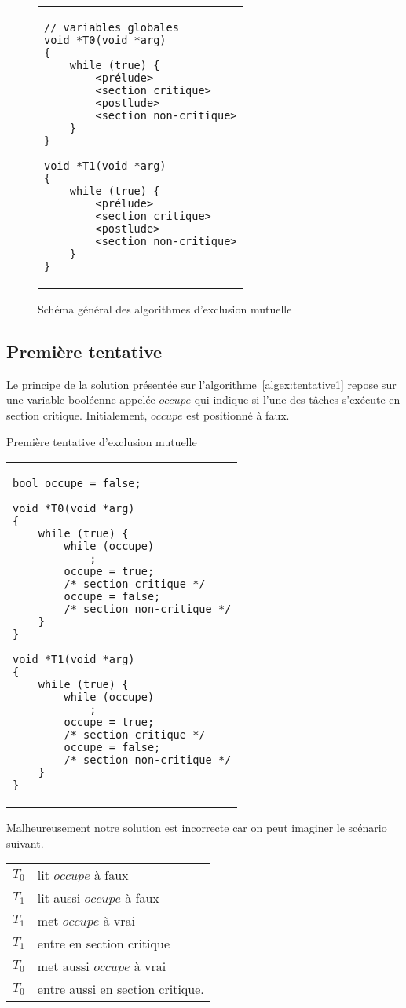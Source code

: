 \begin{figure}[!ht]

\centering
\begin{tabular}{l}
\lstset{language=C++}
\begin{lstlisting}
// variables globales
void *T0(void *arg)
{
	while (true) {
		<prélude>
		<section critique>
		<postlude>
		<section non-critique>
	}
}

void *T1(void *arg)
{
	while (true) {
		<prélude>
		<section critique>
		<postlude>
		<section non-critique>
	}
}
\end{lstlisting}
\end{tabular}
\caption{\label{algex:générale}Schéma général des algorithmes d'exclusion mutuelle}

\end{figure}

\subsection*{Première tentative}
Le principe de la solution présentée sur l'algorithme~\ref{algex:tentative1} repose sur une variable booléenne appelée $occupe$ qui indique si l'une des tâches s'exécute en section critique.
Initialement, $occupe$ est positionné à faux.

\begin{algorithm}[!ht]
\caption{Première tentative d'exclusion mutuelle}\label{algex:tentative1}
\centering
\begin{tabular}{l}
\lstset{language=C++}
\begin{lstlisting}
bool occupe = false;

void *T0(void *arg)
{
	while (true) {
		while (occupe)
			;
		occupe = true;
		/* section critique */
		occupe = false;
		/* section non-critique */
	}
}

void *T1(void *arg)
{
	while (true) {
		while (occupe)
			;
		occupe = true;
		/* section critique */
		occupe = false;
		/* section non-critique */
	}
}
\end{lstlisting}
\end{tabular}

\end{algorithm}

Malheureusement notre solution est incorrecte car on peut imaginer le scénario suivant.
\begin{center}
\begin{tabular}{cl}
$T_0$& lit $occupe$ à faux \\
$T_1$& lit aussi $occupe$ à faux \\
$T_1$& met $occupe$ à vrai \\
$T_1$& entre en section critique \\
$T_0$& met aussi $occupe$ à vrai \\
$T_0$& entre aussi en section critique. \\
\end{tabular}
\end{center}

